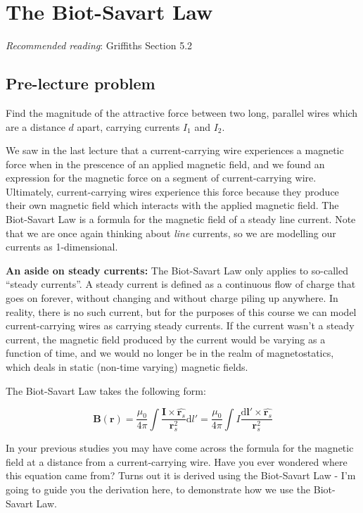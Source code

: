\documentclass[
  letterpaper,
  DIV=11,
  numbers=noendperiod]{scrreprt}
\begin{document}

\chapter{The Biot-Savart Law}\label{the-biot-savart-law}

\emph{Recommended reading}: Griffiths Section 5.2

\section{Pre-lecture problem}\label{pre-lecture-problem-3}

Find the magnitude of the attractive force between two long, parallel
wires which are a distance \(d\) apart, carrying currents \(I_1\) and
\(I_2\).

We saw in the last lecture that a current-carrying wire experiences a
magnetic force when in the prescence of an applied magnetic field, and
we found an expression for the magnetic force on a segment of
current-carrying wire. Ultimately, current-carrying wires experience
this force because they produce their own magnetic field which interacts
with the applied magnetic field. The Biot-Savart Law is a formula for
the magnetic field of a steady line current. Note that we are once again
thinking about \emph{line} currents, so we are modelling our currents as
1-dimensional.

\textbf{An aside on steady currents:} The Biot-Savart Law only applies
to so-called ``steady currents''. A steady current is defined as a
continuous flow of charge that goes on forever, without changing and
without charge piling up anywhere. In reality, there is no such current,
but for the purposes of this course we can model current-carrying wires
as carrying steady currents. If the current wasn't a steady current, the
magnetic field produced by the current would be varying as a function of
time, and we would no longer be in the realm of magnetostatics, which
deals in static (non-time varying) magnetic fields.

The Biot-Savart Law takes the following form:

\[\mathrm{\mathbf{B}}(\mathrm{\mathbf{r}}) = \frac{\mu_0}{4\pi} \int \frac{\mathrm{\mathbf{I}}\times \hat{\mathrm{\mathbf{r}}_s} }{\mathrm{\mathbf{r}}_s^2} \mathrm{d}l' =  \frac{\mu_0}{4\pi} \int I \frac{\mathrm{d} \mathrm{\mathbf{l}}' \times \hat{\mathrm{\mathbf{r}}_s} }{\mathrm{\mathbf{r}}_s^2} \]

In your previous studies you may have come across the formula for the
magnetic field at a distance from a current-carrying wire. Have you ever
wondered where this equation came from? Turns out it is derived using
the Biot-Savart Law - I'm going to guide you the derivation here, to
demonstrate how we use the Biot-Savart Law.
\end{document}
